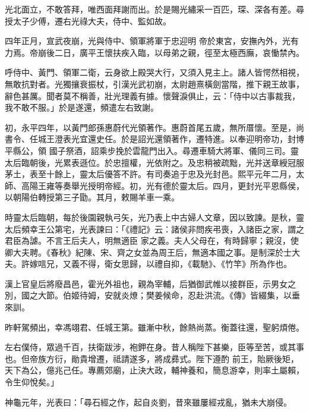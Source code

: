 \begin{pinyinscope}
 光北面立，不敢答拜，唯西面拜謝而出。於是賜光繡采一百匹，琛、深各有差。尋授太子少傅，遷右光祿大夫，侍中、監如故。



 四年正月，宣武夜崩，光與侍中、領軍將軍于忠迎明
 帝於東宮，安撫內外，光有力焉。帝崩後二日，廣平王懷扶疾入臨，以母弟之親，徑至太極西廡，哀慟禁內。



 呼侍中、黃門、領軍二衛，云身欲上殿哭大行，又須入見主上。諸人皆愕然相視，無敢抗對者。光獨攘衰振杖，引漢光武初崩，太尉趙熹橫劍當階，推下親王故事，辭色甚厲。聞者莫不稱善，壯光理義有據。懷聲淚俱止，云：「侍中以古事裁我，我不敢不服。」於是遂還，頻遣左右致謝。



 初，永平四年，以黃門郎孫惠蔚代光領著作。惠蔚首尾五歲，無所厝懷。至是，尚書令、任城王澄表光宜還史任。於是詔光還領著作，遷特進。以奉迎明帝功，封博平縣公，領
 國子祭酒，詔乘步挽於雲龍門出入。尋遷車騎大將軍、儀同三司。靈太后臨朝後，光累表遜位。於忠擅權，光依附之。及忠稍被疏黜，光并送章綬冠服茅土，表至十餘上，靈太后優答不許。有司奏追于忠及光封邑。熙平元年二月，太師、高陽王雍等奏舉光授明帝經。初，光有德於靈太后。四月，更封光平恩縣侯，以朝陽伯轉授第三子勖。其月，敕賜羊車一乘。



 時靈太后臨朝，每於後園親執弓矢，光乃表上中古婦人文章，因以致諫。是秋，靈太后頻幸王公第宅，光表諫曰：「《禮記》云：諸侯非問疾弔喪，入諸臣之家，謂之君臣為謔。不言王后夫人，明無適臣
 家之義。夫人父母在，有時歸寧；親沒，使卿大夫聘。《春秋》紀陳、宋、齊之女並為周王后，無適本國之事。是制深於士大夫。許嫁唁兄，又義不得，衛女思歸，以禮自抑，《載馳》、《竹竿》所為作也。



 漢上官皇后將廢昌邑，霍光外祖也，親為宰輔，后猶御武帷以接群臣，示男女之別，國之大節。伯姬待姆，安就炎燎；樊姜候命，忍赴洪流。《傳》皆綴集，以垂來訓。



 昨軒駕頻出，幸馮翊君、任城王第。雖漸中秋，餘熱尚蒸。衡蓋往還，聖躬煩倦。



 左右僕侍，眾過千百，扶衛跋涉，袍鉀在身。昔人稱陛下甚樂，臣等至苦，或其事也。但帝族方衍，勛貴增遷，祗請遂多，將成彞式。陛下遵酌
 前王，貽厥後矩，天下為公，億兆己任。專薦郊廟，止決大政，輔神養和，簡息游幸，則率土屬賴，令生仰悅矣。」



 神龜元年，光表曰：「尋石經之作，起自炎劉，昔來雖屢經戎亂，猶未大崩侵。




\end{pinyinscope}
